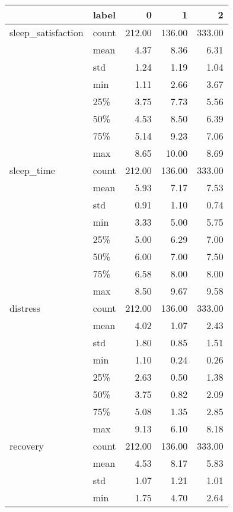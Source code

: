 \begin{tabular}{llrrr}
\toprule
        & label &       0 &       1 &       2 \\
\midrule
sleep\_satisfaction & count &  212.00 &  136.00 &  333.00 \\
        & mean &    4.37 &    8.36 &    6.31 \\
        & std &    1.24 &    1.19 &    1.04 \\
        & min &    1.11 &    2.66 &    3.67 \\
        & 25\% &    3.75 &    7.73 &    5.56 \\
        & 50\% &    4.53 &    8.50 &    6.39 \\
        & 75\% &    5.14 &    9.23 &    7.06 \\
        & max &    8.65 &   10.00 &    8.69 \\
sleep\_time & count &  212.00 &  136.00 &  333.00 \\
        & mean &    5.93 &    7.17 &    7.53 \\
        & std &    0.91 &    1.10 &    0.74 \\
        & min &    3.33 &    5.00 &    5.75 \\
        & 25\% &    5.00 &    6.29 &    7.00 \\
        & 50\% &    6.00 &    7.00 &    7.50 \\
        & 75\% &    6.58 &    8.00 &    8.00 \\
        & max &    8.50 &    9.67 &    9.58 \\
distress & count &  212.00 &  136.00 &  333.00 \\
        & mean &    4.02 &    1.07 &    2.43 \\
        & std &    1.80 &    0.85 &    1.51 \\
        & min &    1.10 &    0.24 &    0.26 \\
        & 25\% &    2.63 &    0.50 &    1.38 \\
        & 50\% &    3.75 &    0.82 &    2.09 \\
        & 75\% &    5.08 &    1.35 &    2.85 \\
        & max &    9.13 &    6.10 &    8.18 \\
recovery & count &  212.00 &  136.00 &  333.00 \\
        & mean &    4.53 &    8.17 &    5.83 \\
        & std &    1.07 &    1.21 &    1.01 \\
        & min &    1.75 &    4.70 &    2.64 \\

\end{tabular}
